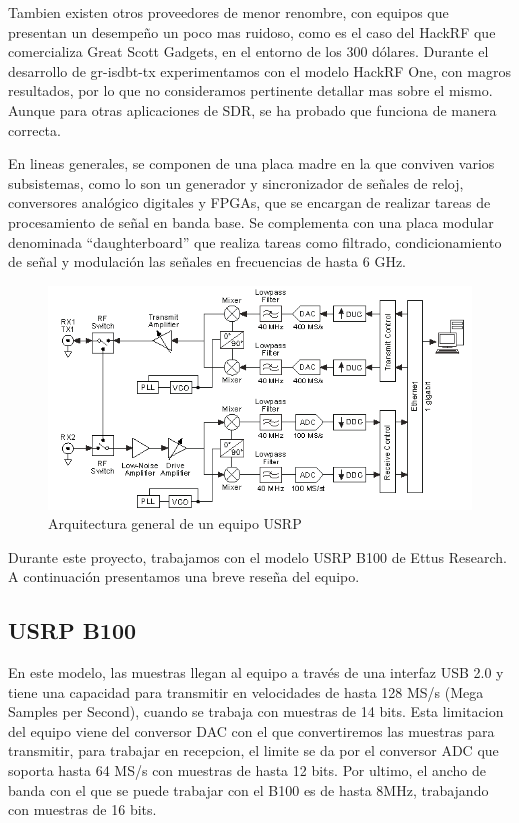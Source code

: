 Tambien existen otros proveedores de menor renombre, con equipos que presentan un desempeño un poco mas ruidoso, como es el caso del HackRF que comercializa Great Scott Gadgets\cite{GreatScottGadgets}, en el entorno de los 300 dólares. Durante el desarrollo de gr-isdbt-tx experimentamos con el modelo HackRF One, con magros resultados, por lo que no consideramos pertinente detallar mas sobre el mismo. Aunque para otras aplicaciones de SDR, se ha probado que funciona de manera correcta.

En lineas generales, se componen de una placa madre en la que conviven varios subsistemas, como lo son un generador y sincronizador de señales de reloj, conversores analógico digitales y FPGAs, que se encargan de realizar tareas de procesamiento de señal en banda base. Se complementa con una placa modular denominada “daughterboard” que realiza tareas como filtrado, condicionamiento de señal y modulación las señales en frecuencias de hasta 6 GHz.

\begin{figure}[h!]
	\centering
	\includegraphics[scale=0.55]{figuras/cap04/usrp_arq}
	\caption{\label{f:usrp_arq} Arquitectura general de un equipo USRP\cite{USRP_arch}}
\end{figure}

Durante este proyecto, trabajamos con el modelo USRP B100 de Ettus Research. A continuación presentamos una breve reseña del equipo.

\subsection{USRP B100}

En este modelo, las muestras llegan al equipo a través de una interfaz USB 2.0 y tiene una capacidad para transmitir en velocidades de hasta 128 MS/s (Mega Samples per Second), cuando se trabaja con muestras de 14 bits. Esta limitacion del equipo viene del conversor DAC con el que convertiremos las muestras para transmitir, para trabajar en recepcion, el limite se da por el conversor ADC que soporta hasta 64 MS/s con muestras de hasta 12 bits. Por ultimo, el ancho de banda con el que se puede trabajar con el B100 es de hasta 8MHz, trabajando con muestras de 16 bits.\cite{b100}  

